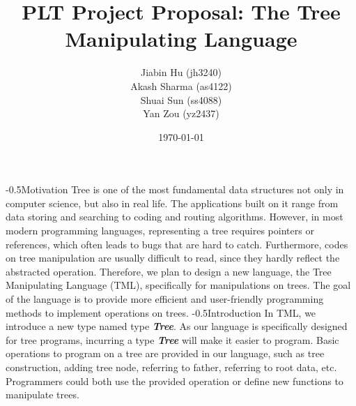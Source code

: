 \documentclass[aps,letterpaper,10pt]{revtex4}
\makeatletter
\renewcommand{\section}{\@startsection{section}{1}{0mm}
  {-\baselineskip}{0.5\baselineskip}{\bf\leftline}}
\makeatother
\begin{document}





\title{\large \bfseries PLT Project Proposal: The Tree Manipulating Language\\}

\author{
Jiabin Hu (jh3240)\\
Akash Sharma (as4122)\\
Shuai Sun (ss4088)\\
Yan Zou (yz2437)
}
\date{\today}

\maketitle






\section{Motivation}
Tree is one of the most fundamental data structures not only in computer science, but also in real life. The applications built on it range from data storing and searching to coding and routing algorithms. However, in most modern programming languages, representing a tree requires pointers or references, which often leads to bugs that are hard to catch. Furthermore, codes on tree manipulation are usually difficult to read, since they hardly reflect the abstracted operation. Therefore, we plan to design a new language, the Tree Manipulating Language (TML), specifically for manipulations on trees. The goal of the language is to provide more efficient and user-friendly programming methods to implement operations on trees.
\section{Introduction}
In TML, we introduce a new type named type \textbf{\emph{Tree}}. As our language is specifically designed for tree programs, incurring a type \textbf{\emph{Tree}} will make it easier to program. Basic operations to program on a tree are provided in our language, such as tree construction, adding tree node, referring to father, referring to root data, etc. Programmers could both use the provided operation or define new functions to manipulate trees.
\end{document}
